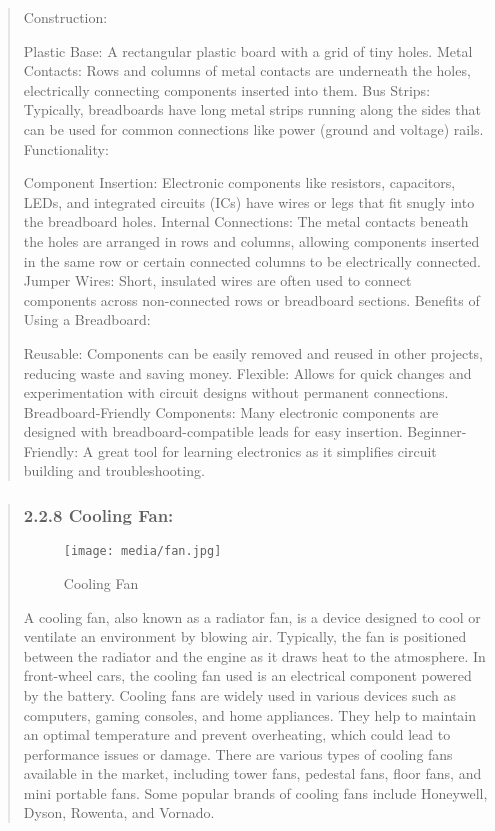 \documentclass[12pt]{report}
\begin{document}
\begin{quote}
				Construction:
				
				Plastic Base: A rectangular plastic board with a grid of tiny holes.
				Metal Contacts: Rows and columns of metal contacts are underneath the holes, electrically connecting components inserted into them.
				Bus Strips: Typically, breadboards have long metal strips running along the sides that can be used for common connections like power (ground and voltage) rails.
				Functionality:
				
				Component Insertion: Electronic components like resistors, capacitors, LEDs, and integrated circuits (ICs) have wires or legs that fit snugly into the breadboard holes.
				Internal Connections: The metal contacts beneath the holes are arranged in rows and columns, allowing components inserted in the same row or certain connected columns to be electrically connected.
				Jumper Wires: Short, insulated wires are often used to connect components across non-connected rows or breadboard sections.
				Benefits of Using a Breadboard:
				
				Reusable: Components can be easily removed and reused in other projects, reducing waste and saving money.
				Flexible: Allows for quick changes and experimentation with circuit designs without permanent connections.
				Breadboard-Friendly Components: Many electronic components are designed with breadboard-compatible leads for easy insertion.
				Beginner-Friendly: A great tool for learning electronics as it simplifies circuit building and troubleshooting.
				\end{quote}
				\clearpage
				
				
				\begin{quote}
					\subsubsection{2.2.8 Cooling Fan:}
					\begin{figure}[h]
						\centering
					\texttt{[image: media/fan.jpg]}\\
						\caption{Cooling Fan}
					\end{figure}
					
				A cooling fan, also known as a radiator fan, is a device designed to cool or ventilate an environment by blowing air. Typically, the fan is positioned between the radiator and the engine as it draws heat to the atmosphere. In front-wheel cars, the cooling fan used is an electrical component powered by the battery. Cooling fans are widely used in various devices such as computers, gaming consoles, and home appliances. They help to maintain an optimal temperature and prevent overheating, which could lead to performance issues or damage. There are various types of cooling fans available in the market, including tower fans, pedestal fans, floor fans, and mini portable fans. Some popular brands of cooling fans include Honeywell, Dyson, Rowenta, and Vornado.
				\end{quote}
				
\end{document}
